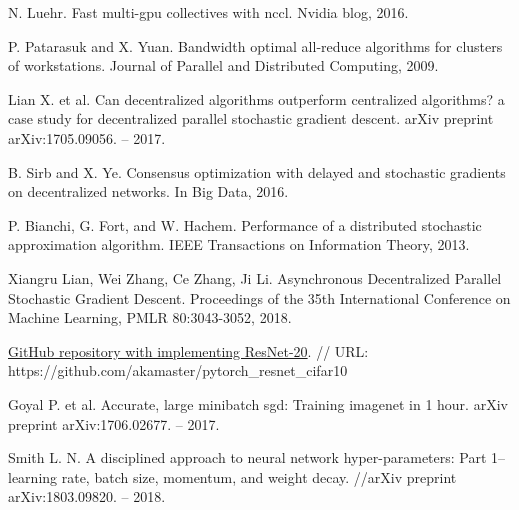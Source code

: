 \documentclass[a4paper,article,14pt]{extarticle}
\begin{document}
\begin{thebibliography}{1}
  N. Luehr. \flqq Fast multi-gpu collectives with nccl\frqq. Nvidia blog, 2016.

  P. Patarasuk and X. Yuan. \flqq Bandwidth optimal all-reduce algorithms for clusters of workstations\frqq. Journal of Parallel and Distributed Computing, 2009.

 Lian X. et al. \flqq Can decentralized algorithms outperform centralized algorithms? a case study for decentralized parallel stochastic gradient descent\frqq. arXiv preprint arXiv:1705.09056. – 2017.

 B. Sirb and X. Ye. \flqq Consensus optimization with delayed and stochastic gradients on decentralized networks\frqq. In Big Data, 2016.

 P. Bianchi, G. Fort, and W. Hachem. \flqq Performance of a distributed stochastic approximation algorithm\frqq. IEEE Transactions on Information Theory, 2013.

 Xiangru Lian, Wei Zhang, Ce Zhang, Ji Li. \flqq Asynchronous Decentralized Parallel Stochastic Gradient Descent\frqq. Proceedings of the 35th International Conference on Machine Learning, PMLR 80:3043-3052, 2018.

 \href{https://github.com/akamaster/pytorch_resnet_cifar10}{GitHub repository with implementing ResNet-20}. // URL: https://github.com/akamaster/pytorch\_resnet\_cifar10

 Goyal P. et al. \flqq Accurate, large minibatch sgd: Training imagenet in 1 hour\frqq. arXiv preprint arXiv:1706.02677. – 2017.

 Smith L. N. \flqq A disciplined approach to neural network hyper-parameters: Part 1--learning rate, batch size, momentum, and weight decay\frqq. //arXiv preprint arXiv:1803.09820. – 2018.

\end{thebibliography}
\end{document}
